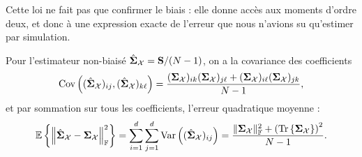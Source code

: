 Cette loi ne fait pas que confirmer le biais : elle donne accès aux moments d'ordre deux, et donc à une expression exacte de l'erreur que nous n'avions su qu'estimer par simulation.

\begin{proposition}
\label{prop:context-distributions-msescm}
  Pour l'estimateur non-biaisé $\hat{\boldsymbol{\Sigma}}_{\mathcal{X}} = \mathbf{S}/(N-1)$, on a la covariance des coefficients
  \begin{equation}
    \operatorname{\operatorname{Cov}}\left(
      (\hat{\boldsymbol{\Sigma}}_{\mathcal{X}})_{ij},
      (\hat{\boldsymbol{\Sigma}}_{\mathcal{X}})_{k\ell}
    \right)
    =
    \frac{
      (\boldsymbol{\Sigma}_{\mathcal{X}})_{i k}(\boldsymbol{\Sigma}_{\mathcal{X}})_{j \ell}
      + (\boldsymbol{\Sigma}_{\mathcal{X}})_{i \ell}(\boldsymbol{\Sigma}_{\mathcal{X}})_{j k}
    }{N-1},
    \label{eq:context-distributions-covscm}
  \end{equation}
  et par sommation sur tous les coefficients, l'erreur quadratique moyenne :
  \begin{equation}
    \operatorname{\mathbb{E}}\left\{
      \left\|\hat{\boldsymbol{\Sigma}}_{\mathcal{X}} - \boldsymbol{\Sigma}_{\mathcal{X}}\right\|_{\mathbb{F}}^2
    \right\}
    =
    \sum_{i=1}^{d}\sum_{j=1}^{d}
    \operatorname{\operatorname{Var}}\left((\hat{\boldsymbol{\Sigma}}_{\mathcal{X}})_{ij}\right)
    =
    \frac{
      \|\boldsymbol{\Sigma}_{\mathcal{X}}\|_{\mathbb{F}}^2 + \left(\operatorname{\operatorname{Tr}}\left\{\boldsymbol{\Sigma}_{\mathcal{X}}\right\}\right)^2
    }{N-1}.
    \label{eq:context-distributions-msescm}
  \end{equation}
\end{proposition}


